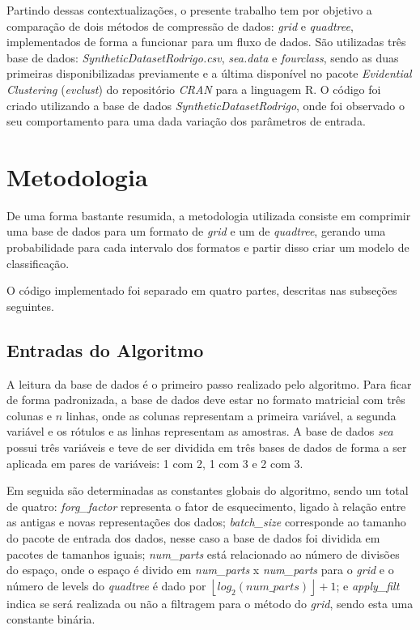 \documentclass[conference]{IEEEtran}
\begin{document}
Partindo dessas contextualizações, o presente trabalho tem por objetivo a comparação de dois métodos de compressão de dados: \textit{grid} e \textit{quadtree}, implementados de forma a funcionar para um fluxo de dados. São utilizadas três base de dados: \textit{SyntheticDatasetRodrigo.csv}, \textit{sea.data} e \textit{fourclass}, sendo as duas primeiras disponibilizadas previamente e a última disponível no pacote \textit{Evidential Clustering} (\textit{evclust}) do repositório \textit{CRAN} para a linguagem R. O código foi criado utilizando a base de dados \textit{SyntheticDatasetRodrigo}, onde foi observado o seu comportamento para uma dada variação dos parâmetros de entrada.



\section{Metodologia} \label{metod}

De uma forma bastante resumida, a metodologia utilizada consiste em comprimir uma base de dados para um formato de \textit{grid} e um de \textit{quadtree}, gerando uma probabilidade para cada intervalo dos formatos e partir disso criar um modelo de classificação.

O código implementado foi separado em quatro partes, descritas nas subseções seguintes.



\subsection{Entradas do Algoritmo} \label{metod_1}

A leitura da base de dados é o primeiro passo realizado pelo algoritmo. Para ficar de forma padronizada, a base de dados deve estar no formato matricial com três colunas e $n$ linhas, onde as colunas representam a primeira variável, a segunda variável e os rótulos e as linhas representam as amostras. A base de dados \textit{sea} possui três variáveis e teve de ser dividida em três bases de dados de forma a ser aplicada em pares de variáveis: 1 com 2, 1 com 3 e 2 com 3.

Em seguida são determinadas as constantes globais do algoritmo, sendo um total de quatro: \textit{forg\_factor} representa o fator de esquecimento, ligado à relação entre as antigas e novas representações dos dados; \textit{batch\_size} corresponde ao tamanho do pacote de entrada dos dados, nesse caso a base de dados foi dividida em pacotes de tamanhos iguais; \textit{num\_parts} está relacionado ao número de divisões do espaço, onde o espaço é divido em \textit{num\_parts} x \textit{num\_parts} para o \textit{grid} e o número de levels do \textit{quadtree} é dado por $\left \lfloor log_{2}(num\_parts) \right \rfloor+1$; e \textit{apply\_filt} indica se será realizada ou não a filtragem para o método do \textit{grid}, sendo esta uma constante binária.
\end{document}
